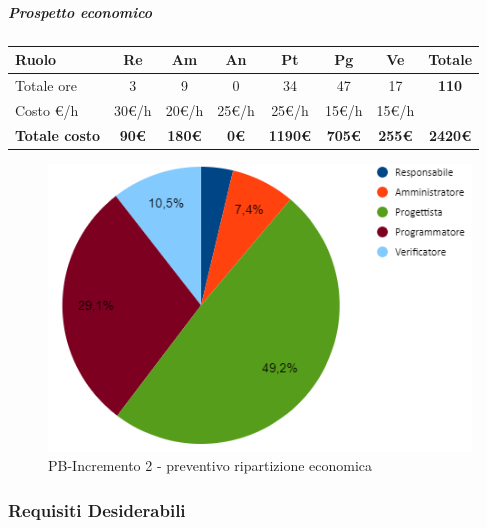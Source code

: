 \subparagraph{Prospetto economico}
\begin{center}
	\renewcommand{\arraystretch}{1.8} %
	\begin{tabular}{ |m{10em}|c|c|c|c|c|c|c| }
	\hline
	\textbf{Ruolo} & \textbf{Re} & \textbf{Am} &  \textbf{An} &  \textbf{Pt} &  \textbf{Pg} &  \textbf{Ve} &  \textbf{Totale}\\
    \hline
    Totale ore & 3 & 9 & 0 & 34 & 47 & 17 & \textbf{110}\\
    \hline
    Costo \euro/h & 30\euro/h & 20\euro/h & 25\euro/h & 25\euro/h & 15\euro/h & 15\euro/h & \\
    \hline
    \textbf{Totale costo} & \textbf{90\euro} & \textbf{180\euro} &  \textbf{0\euro} &  \textbf{1190\euro} &  \textbf{705\euro} &  \textbf{255\euro} &  \textbf{2420\euro}\\
    \hline
	\end{tabular}

    \begin{figure}[H]
       \centering\includegraphics{images/preventivo/PB-incremento2-costo.png}
       \caption{PB-Incremento 2 - preventivo ripartizione economica}
    \end{figure}
\end{center}


\subsubsection{Requisiti Desiderabili}
